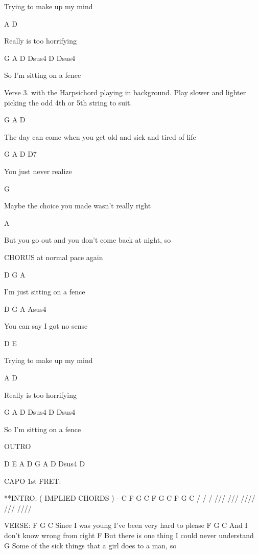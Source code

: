 Trying to make up my mind

A             D

Really is too horrifying

G        A          D      Dsus4   D  Dsus4

So I'm sitting on a fence


Verse 3. with the Harpsichord playing in background. Play slower and lighter picking the 
odd 4th or 5th string to suit.


G               A                            D

The day can come when you get old and sick and tired of life

G        A         D       D7

You just never realize

G

Maybe the choice you made wasn't really right

A

But you go out and you don't come back at night, so


CHORUS at normal pace again

D        G            A

I'm just sitting on a fence

D       G            A      Asus4

You can say I got no sense

D             E

Trying to make up my mind

A           D

Really is too horrifying

G        A          D      Dsus4   D  Dsus4

So I'm sitting on a fence


OUTRO

D   E   A    D   G    A    D   Dsus4  D





CAPO 1st FRET:


**INTRO: ( IMPLIED CHORDS ) - C F G   C   F   G    C   F  G  C 
                              / / /  /// /// //// ///        ////


VERSE:
      F                             G             C
       Since I was young I've been very hard to please
      F       G                     C
       And I don't know wrong from right
      F     
       But there is one thing I could never understand
      G
       Some of the sick things that a girl does to a man, so


